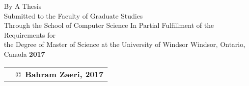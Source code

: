 \pagebreak
{
\centering
\thesistitlee
\tpbreak
By
\tpbreak
\nameanddegrees
\tpbreak
A Thesis \\
Submitted to the Faculty of Graduate Studies \\
Through the School of Computer Science
\tpbreak
In Partial Fulfillment of the Requirements for \\
the Degree of Master of Science at the 
\tpbreak University of Windsor
\tpbreak Windsor, Ontario, Canada
\tpbreak \textbf{2017}
\vfill
\begin{tabular}{cl}
& \copyright\ \textbf{Bahram Zaeri, 2017}\\
\end{tabular}
\tpbreak
\hfill
}
\pagebreak
